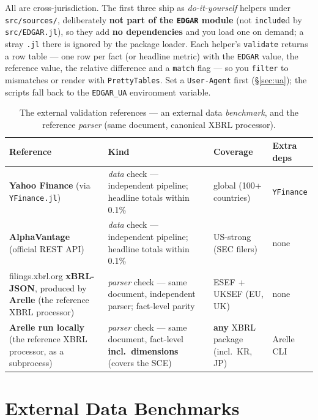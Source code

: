 \documentclass[11pt,a4paper]{report}
\begin{document}
\noindent All are cross-jurisdiction. The first three ship as \emph{do-it-yourself} helpers under
\texttt{src/sources/}, deliberately \textbf{not part of the \texttt{EDGAR} module} (not \texttt{include}d by
\texttt{src/EDGAR.jl}), so they add \textbf{no dependencies} and you load one on demand; a stray \texttt{.jl}
there is ignored by the package loader. Each helper's \texttt{validate} returns a row table --- one row per
fact (or headline metric) with the \texttt{EDGAR} value, the reference value, the relative difference and a
\texttt{match} flag --- so you \texttt{filter} to mismatches or render with \texttt{PrettyTables}. Set a
\texttt{User-Agent} first (\S\ref{sec:ua}); the scripts fall back to the \texttt{EDGAR\_UA} environment variable.

\begin{table}[h]
\centering
\caption{The external validation references --- an external data \emph{benchmark}, and the reference
\emph{parser} (same document, canonical XBRL processor).}
\label{tab:oracles}
\small
\begin{tabular}{@{}p{}p{}p{}p{}@{}}
\toprule
\textbf{Reference} & \textbf{Kind} & \textbf{Coverage} & \textbf{Extra deps} \\
\midrule
\textbf{Yahoo Finance} (via \texttt{YFinance.jl}) & \emph{data} check --- independent pipeline; headline totals within 0.1\% & global (100+ countries) & \texttt{YFinance} \\
\textbf{AlphaVantage} (official REST API) & \emph{data} check --- independent pipeline; headline totals within 0.1\% & US-strong (SEC filers) & none \\
filings.xbrl.org \textbf{xBRL-JSON}, produced by \textbf{Arelle} (the reference XBRL processor) & \emph{parser} check --- same document, independent parser; fact-level parity & ESEF + UKSEF (EU, UK) & none \\
\textbf{Arelle run locally} (the reference XBRL processor, as a subprocess) & \emph{parser} check --- same document, fact-level \textbf{incl.\ dimensions} (covers the SCE) & \textbf{any} XBRL package (incl.\ KR, JP) & Arelle CLI \\
\bottomrule
\end{tabular}
\end{table}

\section{External Data Benchmarks}
\label{sec:validation-sources}
\end{document}
